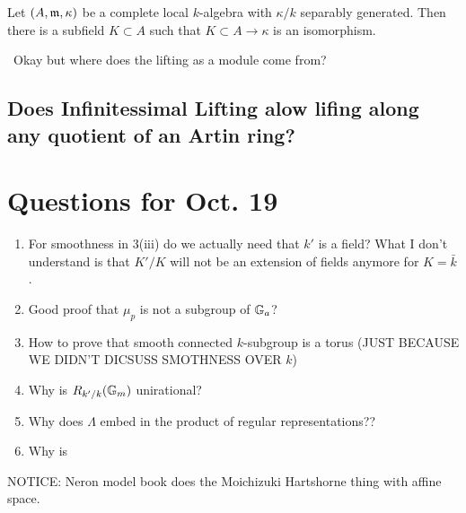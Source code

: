 \documentclass[12pt]{article}
\begin{document}
\begin{theorem}
Let $(A, \mathfrak{m}, \kappa)$ be a complete local $k$-algebra with $\kappa / k$ separably generated. Then there is a subfield $K \subset A$ such that $K \subset A \to \kappa$ is an isomorphism.
\end{theorem}
\noindent\
Okay but where does the lifting as a module come from?

\subsection{Does Infinitessimal Lifting alow lifing along any quotient of an Artin ring?}

\section{Questions for Oct. 19}

\begin{enumerate}
\item For smoothness in 3(iii) do we actually need that $k'$ is a field? What I don't understand is that $K'/K$ will not be an extension of fields anymore for $K = \bar{k}$.
\item Good proof that $\mu_p$ is not a subgroup of $\mathbb{G}_a$?
\item How to prove that smooth connected $k$-subgroup is a torus (JUST BECAUSE WE DIDN'T DICSUSS SMOTHNESS OVER $k$)
\item Why is $R_{k'/k}(\mathbb{G}_m)$ unirational?
\item Why does $\Lambda$ embed in the product of regular representations??
\item Why is 
\end{enumerate}


\begin{rmk}
NOTICE: Neron model book does the Moichizuki Hartshorne thing with affine space.
\end{rmk}
\end{document}
